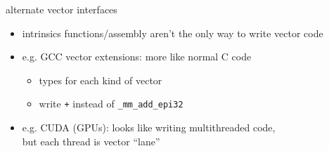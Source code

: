\begin{frame}{alternate vector interfaces}
    \begin{itemize}
    \item intrinsics functions/assembly aren't the only way to write vector code
    \item e.g. GCC vector extensions: more like normal C code 
        \begin{itemize}
        \item types for each kind of vector
        \item write {\tt +} instead of {\tt \_mm\_add\_epi32}
        \end{itemize}
    \item e.g. CUDA (GPUs): looks like writing multithreaded code, \\ but each thread is vector ``lane''
    \end{itemize}
\end{frame}

